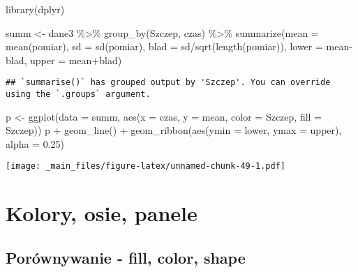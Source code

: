 \documentclass[
]{book}
\newenvironment{Shaded}{\begin{snugshade}}{\end{snugshade}}
\newcommand{\AttributeTok}[1]{\textcolor[rgb]{0.77,0.63,0.00}{#1}}
\newcommand{\FloatTok}[1]{\textcolor[rgb]{0.00,0.00,0.81}{#1}}
\newcommand{\FunctionTok}[1]{\textcolor[rgb]{0.00,0.00,0.00}{#1}}
\newcommand{\NormalTok}[1]{#1}
\newcommand{\OtherTok}[1]{\textcolor[rgb]{0.56,0.35,0.01}{#1}}
\newcommand{\SpecialCharTok}[1]{\textcolor[rgb]{0.00,0.00,0.00}{#1}}
\begin{document}
\begin{Shaded}
\begin{Highlighting}[]
\FunctionTok{library}\NormalTok{(dplyr)}

\NormalTok{summ }\OtherTok{\textless{}{-}}\NormalTok{ dane3 }\SpecialCharTok{\%\textgreater{}\%} \FunctionTok{group\_by}\NormalTok{(Szczep, czas) }\SpecialCharTok{\%\textgreater{}\%} 
  \FunctionTok{summarize}\NormalTok{(}\AttributeTok{mean =} \FunctionTok{mean}\NormalTok{(pomiar), }
            \AttributeTok{sd =} \FunctionTok{sd}\NormalTok{(pomiar), }
            \AttributeTok{blad =}\NormalTok{ sd}\SpecialCharTok{/}\FunctionTok{sqrt}\NormalTok{(}\FunctionTok{length}\NormalTok{(pomiar)), }
            \AttributeTok{lower =}\NormalTok{ mean}\SpecialCharTok{{-}}\NormalTok{blad, }
            \AttributeTok{upper =}\NormalTok{ mean}\SpecialCharTok{+}\NormalTok{blad)}
\end{Highlighting}
\end{Shaded}

\begin{verbatim}
## `summarise()` has grouped output by 'Szczep'. You can override using the `.groups` argument.
\end{verbatim}

\begin{Shaded}
\begin{Highlighting}[]
\NormalTok{p }\OtherTok{\textless{}{-}} \FunctionTok{ggplot}\NormalTok{(}\AttributeTok{data =}\NormalTok{ summ, }\FunctionTok{aes}\NormalTok{(}\AttributeTok{x =}\NormalTok{ czas, }\AttributeTok{y =}\NormalTok{ mean, }\AttributeTok{color =}\NormalTok{ Szczep, }\AttributeTok{fill =}\NormalTok{ Szczep))}
\NormalTok{p }\SpecialCharTok{+} \FunctionTok{geom\_line}\NormalTok{() }\SpecialCharTok{+} \FunctionTok{geom\_ribbon}\NormalTok{(}\FunctionTok{aes}\NormalTok{(}\AttributeTok{ymin =}\NormalTok{ lower, }\AttributeTok{ymax =}\NormalTok{ upper), }\AttributeTok{alpha =} \FloatTok{0.25}\NormalTok{)}
\end{Highlighting}
\end{Shaded}

\texttt{[image: \_main\_files/figure-latex/unnamed-chunk-49-1.pdf]}

\hypertarget{kolory-osie-panele}{%
\section{Kolory, osie, panele}\label{kolory-osie-panele}}

\hypertarget{poruxf3wnywanie---fill-color-shape}{%
\subsection{Porównywanie - fill, color, shape}\label{poruxf3wnywanie---fill-color-shape}}
\end{document}
